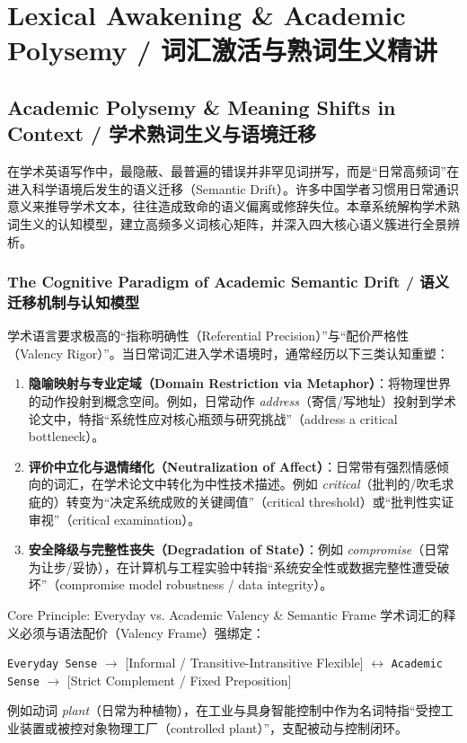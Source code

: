 \part{Lexical Awakening \& Academic Polysemy / 词汇激活与熟词生义精讲}\label{part:lexicon}

\chapter{Academic Polysemy \& Meaning Shifts in Context / 学术熟词生义与语境迁移}\label{ch:polysemy}
在学术英语写作中，最隐蔽、最普遍的错误并非罕见词拼写，而是“日常高频词”在进入科学语境后发生的语义迁移（Semantic Drift）。许多中国学者习惯用日常通识意义来推导学术文本，往往造成致命的语义偏离或修辞失位。本章系统解构学术熟词生义的认知模型，建立高频多义词核心矩阵，并深入四大核心语义簇进行全景辨析。

\section{The Cognitive Paradigm of Academic Semantic Drift / 语义迁移机制与认知模型}
学术语言要求极高的“指称明确性（Referential Precision）”与“配价严格性（Valency Rigor）”。当日常词汇进入学术语境时，通常经历以下三类认知重塑：
\begin{enumerate}[label=\textbf{\color{AcadNavy}\arabic*.}, leftmargin=2em]
  \item \textbf{隐喻映射与专业定域（Domain Restriction via Metaphor）}：将物理世界的动作投射到概念空间。例如，日常动作 \textit{address}（寄信/写地址）投射到学术论文中，特指“系统性应对核心瓶颈与研究挑战”（address a critical bottleneck）。
  \item \textbf{评价中立化与退情绪化（Neutralization of Affect）}：日常带有强烈情感倾向的词汇，在学术论文中转化为中性技术描述。例如 \textit{critical}（批判的/吹毛求疵的）转变为“决定系统成败的关键阈值”（critical threshold）或“批判性实证审视”（critical examination）。
  \item \textbf{安全降级与完整性丧失（Degradation of State）}：例如 \textit{compromise}（日常为让步/妥协），在计算机与工程实验中转指“系统安全性或数据完整性遭受破坏”（compromise model robustness / data integrity）。
\end{enumerate}

\begin{ConceptBox}{Core Principle: Everyday vs. Academic Valency \& Semantic Frame}
学术词汇的释义必须与语法配价（Valency Frame）强绑定：\par
\begin{center}
\small\texttt{Everyday Sense} $\to$ [Informal / Transitive-Intransitive Flexible] $\leftrightarrow$ \texttt{Academic Sense} $\to$ [Strict Complement / Fixed Preposition]
\end{center}
例如动词 \textit{plant}（日常为种植物），在工业与具身智能控制中作为名词特指“受控工业装置或被控对象物理工厂（controlled plant）”，支配被动与控制闭环。
\end{ConceptBox}

